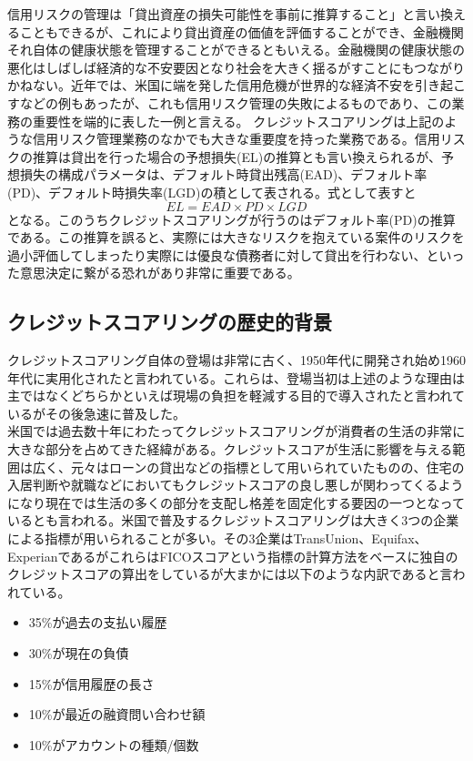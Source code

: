 \documentclass[11pt]{jsarticle}
\providecommand{\tightlist}{%
      \setlength{\itemsep}{0pt}\setlength{\parskip}{0pt}}
\begin{document}
信用リスクの管理は「貸出資産の損失可能性を事前に推算すること」と言い換えることもできるが\cite{risk-management}、これにより貸出資産の価値を評価することができ、金融機関それ自体の健康状態を管理することができるともいえる。金融機関の健康状態の悪化はしばしば経済的な不安要因となり社会を大きく揺るがすことにもつながりかねない。近年では、米国に端を発した信用危機が世界的な経済不安を引き起こすなどの例もあったが、これも信用リスク管理の失敗によるものであり、この業務の重要性を端的に表した一例と言える。
    クレジットスコアリングは上記のような信用リスク管理業務のなかでも大きな重要度を持った業務である。信用リスクの推算は貸出を行った場合の予想損失(EL)の推算とも言い換えられるが、予想損失の構成パラメータは、デフォルト時貸出残高(EAD)、デフォルト率(PD)、デフォルト時損失率(LGD)の積として表される。式として表すと
\[
  EL = EAD \times PD \times LGD
\]
となる。このうちクレジットスコアリングが行うのはデフォルト率(PD)の推算である。この推算を誤ると、実際には大きなリスクを抱えている案件のリスクを過小評価してしまったり実際には優良な債務者に対して貸出を行わない、といった意思決定に繋がる恐れがあり非常に重要である。

    \subsection{クレジットスコアリングの歴史的背景}\label{ux30afux30ecux30b8ux30c3ux30c8ux30b9ux30b3ux30a2ux30eaux30f3ux30b0ux306eux6b74ux53f2ux7684ux80ccux666f}
クレジットスコアリング自体の登場は非常に古く、1950年代に開発され始め1960年代に実用化されたと言われている\cite{perspective}。これらは、登場当初は上述のような理由は主ではなくどちらかといえば現場の負担を軽減する目的で導入されたと言われているがその後急速に普及した。\\

米国では過去数十年にわたってクレジットスコアリングが消費者の生活の非常に大きな部分を占めてきた経緯がある。クレジットスコアが生活に影響を与える範囲は広く、元々はローンの貸出などの指標として用いられていたものの、住宅の入居判断や就職などにおいてもクレジットスコアの良し悪しが関わってくるようになり現在では生活の多くの部分を支配し格差を固定化する要因の一つとなっているとも言われる。米国で普及するクレジットスコアリングは大きく3つの企業による指標が用いられることが多い。その3企業はTransUnion、Equifax、ExperianであるがこれらはFICOスコアという指標の計算方法をベースに独自のクレジットスコアの算出をしている\cite{annuity}が大まかには以下のような内訳であると言われている。
    \begin{itemize}
\tightlist
\item
  35\%が過去の支払い履歴
\item
  30\%が現在の負債
\item
  15\%が信用履歴の長さ
\item
  10\%が最近の融資問い合わせ額
\item
  10\%がアカウントの種類/個数
\end{itemize}
\end{document}
